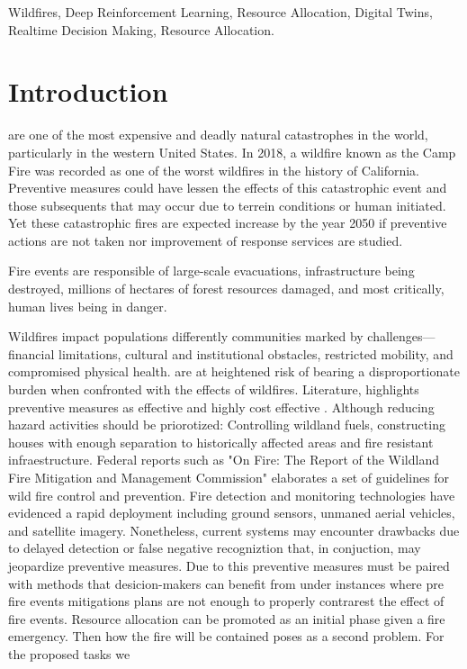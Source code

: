 \documentclass[lettersize,journal]{IEEEtran}
\begin{document}
\begin{IEEEkeywords}
Wildfires, Deep Reinforcement Learning, Resource Allocation, Digital Twins, Realtime Decision Making, Resource Allocation.
\end{IEEEkeywords}

\section{Introduction}\label{Introduction}
 are one of the most expensive and deadly natural catastrophes in the world, particularly in the western United States. 
In 2018, a wildfire known as the Camp Fire was recorded as one of the worst wildfires in the history of California. Preventive measures could have lessen the effects of this catastrophic event  and those subsequents that may occur due to terrein conditions or human initiated.
Yet these catastrophic fires are expected increase by the year 2050 \cite{nations_as_nodate} if preventive actions are not taken nor improvement of response services are studied. 

Fire events are responsible of large-scale evacuations, infrastructure being destroyed, millions of hectares of forest resources damaged, and most critically, human lives being in danger.



Wildfires impact populations differently communities marked by challenges—financial limitations, cultural and institutional obstacles, restricted mobility, and compromised physical health. 
are at heightened risk of bearing a disproportionate burden when confronted with the effects of wildfires. 
Literature, highlights preventive measures as effective and highly cost effective \cite{baylis_economic_2023}. Although reducing hazard activities should be priorotized: Controlling wildland fuels, constructing houses with enough separation to historically affected areas and fire resistant infraestructure. 
Federal reports such as "On Fire: The Report of the Wildland Fire Mitigation and Management Commission" elaborates a set of guidelines for wild fire control and prevention.
Fire detection and monitoring technologies have evidenced a rapid deployment including ground sensors, unmaned aerial vehicles, and satellite imagery.
Nonetheless, current systems may encounter drawbacks due to delayed detection or false negative recogniztion that, in conjuction, may jeopardize 
preventive measures.
Due to this preventive measures must be paired with methods that desicion-makers
can benefit from under instances where pre fire events mitigations plans are not enough to properly contrarest the effect of fire events.
Resource allocation can be promoted as an initial phase given a fire emergency. Then how the fire will be contained poses as a second problem.
For the proposed tasks we 
\end{document}
